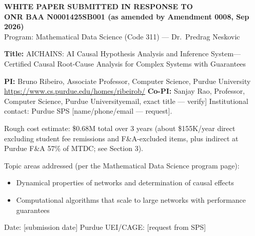\documentclass[12pt]{article}
\begin{document}
\thispagestyle{empty} \begin{center} \textbf{WHITE PAPER SUBMITTED IN RESPONSE TO}\\[4pt]
\textbf{ONR BAA N0001425SB001 (as amended by Amendment 0008, Sep 2026)}\\[4pt]
Program: Mathematical Data Science (Code 311) --- Dr.~Predrag Neskovic \end{center}

\vspace{0.6in}

\noindent\textbf{Title:} AICHAINS: AI Causal Hypothesis Analysis and Inference System---Certified Causal Root-Cause Analysis for Complex Systems with Guarantees

\vspace{0.25in}

\noindent\textbf{PI:} Bruno Ribeiro, Associate Professor, Computer Science, Purdue University \textbar{} \url{https://www.cs.purdue.edu/homes/ribeirob/} \newline \textbf{Co-PI:} Sanjay Rao, Professor, Computer Science, Purdue University\newline {[}email, exact title --- verify{]} \newline Institutional contact: Purdue SPS {[}name/phone/email --- request{]}.

\vspace{0.25in}

\noindent Rough cost estimate: \$0.68M total over 3 years (about \$155K/year direct excluding student fee remissions and F\&A-excluded items, plus indirect at Purdue F\&A 57\% of MTDC; see Section 3).

\vspace{0.25in}

\noindent Topic areas addressed (per the Mathematical Data Science program page): \begin{itemize} \item Dynamical properties of networks and determination of causal effects \item Computational algorithms that scale to large networks with performance guarantees \end{itemize}

\vspace{0.25in}

\noindent Date: {[}submission date{]} \textbar{} Purdue UEI/CAGE: {[}request from SPS{]}

\newpage \setcounter{page}{1}
\end{document}
